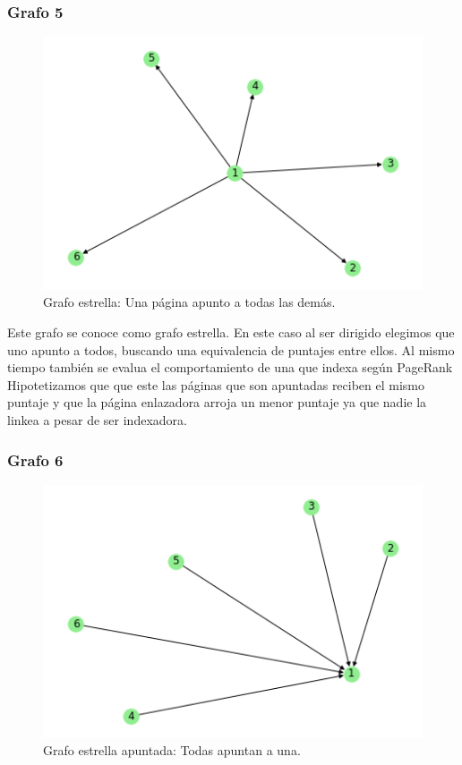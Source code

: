 \subsubsection{Grafo 5}

\begin{figure}[H]
   \begin{center}
     \includegraphics{img/prueba_estrella.png} 
  \end{center}
\caption{Grafo estrella: Una página apunto a todas las demás.} \label{fig:exp3-estrella}
\end{figure}

Este grafo se conoce como grafo estrella. En este caso al ser dirigido elegimos que uno apunto a todos, buscando una equivalencia de puntajes entre ellos. Al mismo tiempo también se evalua el comportamiento de una que indexa según PageRank\\

Hipotetizamos que que este las páginas que son apuntadas reciben el mismo puntaje y que la página enlazadora arroja un menor puntaje ya que nadie la linkea a pesar de ser indexadora. \\

\subsubsection{Grafo 6}

\begin{figure}[H]
   \begin{center}
     \includegraphics{img/prueba_estrella_apuntada.png} 
  \end{center}
\caption{Grafo estrella apuntada: Todas apuntan a una.} \label{fig:exp3-estrella}
\end{figure}


